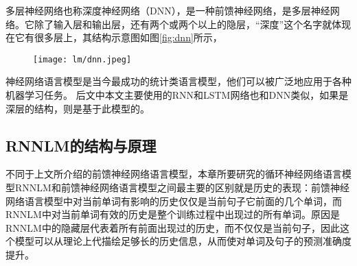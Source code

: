 多层神经网络也称深度神经网络（DNN），是一种前馈神经网络\cite{yu2011improved}，是多层神经网络。它除了输入层和输出层，还有两个或两个以上的隐层，“深度”这个名字就体现在它有很多层上，其结构示意图如图\ref{fig:dnn}所示，
\begin{figure}[!htbp]
  \centering
  \begin{minipage}[b]{0.6\textwidth}
    \captionstyle{\centering}
    \centering
    \texttt{[image: lm/dnn.jpeg]}
  \end{minipage}     
\end{figure}
神经网络语言模型是当今最成功的统计类语言模型，他们可以被广泛地应用于各种机器学习任务。
后文中本文主要使用的RNN和LSTM网络也和DNN类似，如果是深层的结构，则是基于此模型的。




\subsection{RNNLM的结构与原理}

不同于上文所介绍的前馈神经网络语言模型，本章所要研究的循环神经网络语言模型RNNLM和前馈神经网络语言模型之间最主要的区别就是历史的表现：前馈神经网络语言模型中对当前单词有影响的历史仅仅是当前句子它前面的几个单词，而RNNLM中对当前单词有效的历史是整个训练过程中出现过的所有单词。原因是RNNLM中的隐藏层代表着所有前面出现过的历史，而不仅仅是当前句子，因此这个模型可以从理论上代描绘足够长的历史信息，从而使对单词及句子的预测准确度提升。



